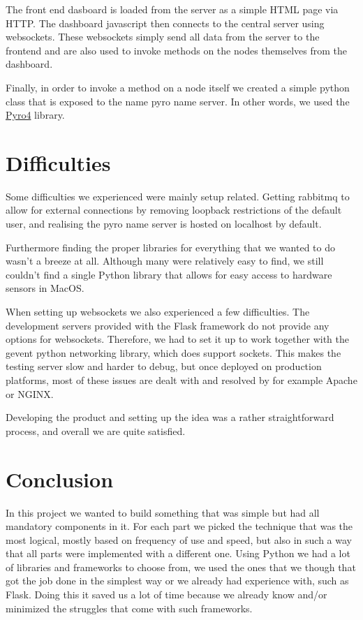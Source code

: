 \documentclass{article}
\begin{document}
	The front end dasboard is loaded from the server as a simple HTML page via 
	HTTP. The dashboard javascript then connects to the central server using 
	websockets. These websockets simply send all data from the server to the 
	frontend and are also used to invoke methods on the nodes themselves
	from the dashboard.

	Finally, in order to invoke a method on a node itself we created a simple 
	python class that is exposed to the name pyro name server. In other words, 
	we used the \href{https://pythonhosted.org/Pyro4/}{Pyro4} library.

\section{Difficulties}
	Some difficulties we experienced were mainly setup related. Getting rabbitmq
	to allow for external connections by removing loopback restrictions of the 
	default user, and realising the pyro name server is hosted on localhost by 
	default. 

	Furthermore finding the proper libraries for everything that we 
	wanted to do wasn't a breeze at all. Although many were relatively easy to 
	find, we still couldn't find a single Python library that allows for easy 
	access to hardware sensors in MacOS. 

	When setting up websockets we also experienced a few difficulties. The 
	development servers provided with the Flask framework do not provide any
	options for websockets. Therefore, we had to set it up to work together with
	the gevent python networking library, which does support sockets. This makes
	the testing server slow and harder to debug, but once deployed on production 
	platforms, most of these issues are dealt with and resolved by for example 
	Apache or NGINX.

	Developing the product and setting up the idea was a rather straightforward 
	process, and overall we are quite satisfied.

\section{Conclusion}
	In this project we wanted to build something that was simple but had all
	mandatory components in it. For each part we picked the technique that 
	was the most logical, mostly based on frequency of use and speed, but also in
	such a way that all parts were implemented with a different one. Using 
	Python we had a lot of libraries and frameworks to choose from, we used 
	the ones that we though that got the job done in the simplest way or we 
	already had experience with, such as Flask. Doing this it saved us a lot of 
	time because we already know and/or minimized the struggles that come with 
	such frameworks. 
\end{document}
